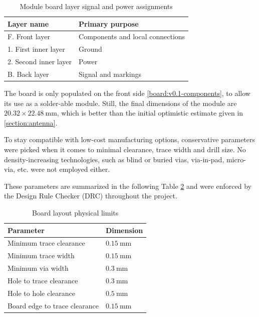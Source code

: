 \begin{table}[H]
\begin{center}
\caption{\label{table:board-layers}Module board layer signal and power assignments}
    \begin{tabular}{|l|l|} \hline
    \textbf{Layer name}     & \textbf{Primary purpose} \\ \hline
    F. Front layer          & Components and local connections \\ \hline
    1. First inner layer    & Ground \\ \hline
    2. Second inner layer   & Power \\ \hline
    B. Back layer           & Signal and markings \\ \hline
    \end{tabular}
\end{center}
\end{table}

The board is only populated on the front side \ref{board:v0.1-components}, to allow its use as a solder-able module. Still, the final dimensions of the module are $20.32 \times 22.48~\mathrm{mm}$, which is better than the initial optimistic estimate given in \ref{section:antenna}.

To stay compatible with low-cost manufacturing options, conservative parameters were picked when it comes to minimal clearance, trace width and drill size. No density-increasing technologies, such as blind or buried vias, via-in-pad, micro-via, etc. were not employed either. 

These parameters are summarized in the following Table \ref{table:board-limits} and were enforced by the Design Rule Checker (DRC) throughout the project.

\begin{table}[H]
\begin{center}
\caption{\label{table:board-limits}Board layout physical limits}
    \begin{tabular}{|l|l|} \hline
    \textbf{Parameter}          & \textbf{Dimension} \\ \hline
    Minimum trace clearance & $0.15~\mathrm{mm}$ \\ \hline
    Minimum trace width & $0.15~\mathrm{mm}$ \\ \hline
    Minimum via width & $0.3~\mathrm{mm}$ \\ \hline
    Hole to trace clearance & $0.3~\mathrm{mm}$ \\ \hline
    Hole to hole clearance & $0.5~\mathrm{mm}$ \\ \hline
    Board edge to trace clearance & $0.15~\mathrm{mm}$ \\ \hline
    \end{tabular}
\end{center}
\end{table}

